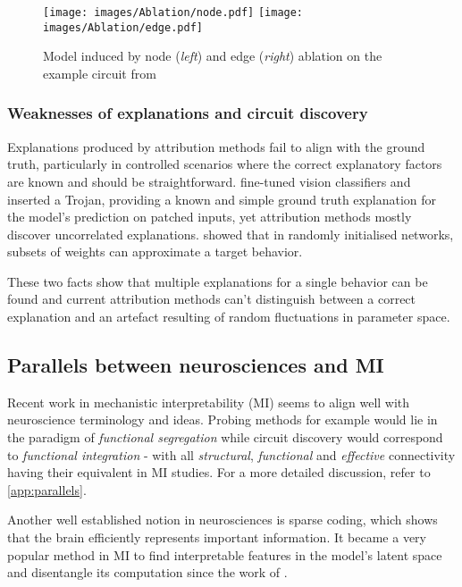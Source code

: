 \documentclass{article}
\begin{document}
\begin{figure}[ht]
    \centering
    \texttt{[image: images/Ablation/node.pdf]}
    \texttt{[image: images/Ablation/edge.pdf]}
    \caption{Model induced by node (\emph{left}) and edge (\emph{right}) ablation on the example circuit from }
    \label{fig:node_edge_ablation}
\end{figure}

\subsubsection{Weaknesses of explanations and circuit discovery}
\label{sec:weaknesses}

Explanations produced by attribution methods fail to align with the ground truth, particularly in controlled scenarios where the correct explanatory factors are known and should be straightforward. \citet{casper2023redteamingdeepneural} fine-tuned vision classifiers and inserted a Trojan, providing a known and simple ground truth explanation for the model's prediction on patched inputs, yet attribution methods mostly discover uncorrelated explanations. \citet{sreenivasan2022rare} showed that in randomly initialised networks, subsets of weights can approximate a target behavior.

These two facts show that multiple explanations for a single behavior can be found and current attribution methods can't distinguish between a correct explanation and an artefact resulting of random fluctuations in parameter space.

\subsection{Parallels between neurosciences and MI}
\label{sec:parallels}

Recent work in mechanistic interpretability (MI) seems to align well with neuroscience terminology and ideas. Probing methods for example would lie in the paradigm of \textit{functional segregation} while circuit discovery would correspond to \textit{functional integration} - with all \textit{structural}, \textit{functional} and \textit{effective} connectivity having their equivalent in MI studies. For a more detailed discussion, refer to \cref{app:parallels}.

Another well established notion in neurosciences is sparse coding, which shows that the brain efficiently represents important information. It became a very popular method in MI to find interpretable features in the model's latent space and disentangle its computation since the work of \citet{bricken2023towards}.
\end{document}
